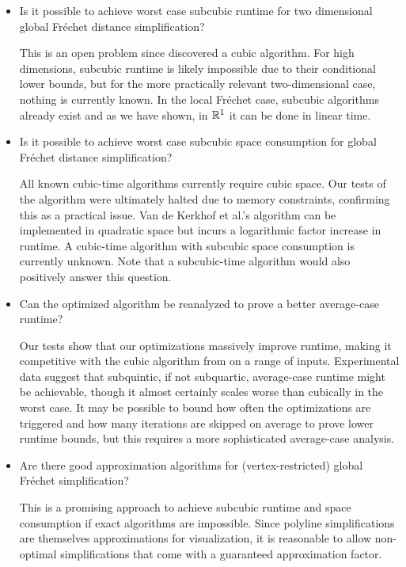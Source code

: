 \begin{itemize}
  \item Is it possible to achieve worst case subcubic runtime for two dimensional global Fréchet distance simplification?

	This is an open problem since \citeauthor{polyline_simplification_has_cubic_complexity_bringmannetal} discovered a cubic algorithm. For high dimensions, subcubic runtime is likely impossible due to their conditional lower bounds, but for the more practically relevant two-dimensional case, nothing is currently known. In the local Fréchet case, subcubic algorithms already exist and as we have shown, in \(\mathbb{R}^1\) it can be done in linear time.
	
	\item Is it possible to achieve worst case subcubic space consumption for global Fréchet distance simplification?

	All known cubic-time algorithms currently require cubic space. Our tests of the \citeauthor{polyline_simplification_has_cubic_complexity_bringmannetal} algorithm were ultimately halted due to memory constraints, confirming this as a practical issue. Van de Kerkhof et al.'s algorithm can be implemented in quadratic space but incurs a logarithmic factor increase in runtime. A cubic-time algorithm with subcubic space consumption is currently unknown. Note that a subcubic-time algorithm would also positively answer this question.

	\item Can the optimized \citeauthor{on_optimal_polyline_simplification_using_the_hausdorff_and_frechet_distance} algorithm be reanalyzed to prove a better average-case runtime?

	Our tests show that our optimizations massively improve runtime, making it competitive with the cubic algorithm from \citeauthor{polyline_simplification_has_cubic_complexity_bringmannetal} on a range of inputs. Experimental data suggest that subquintic, if not subquartic, average-case runtime might be achievable, though it almost certainly scales worse than cubically in the worst case. It may be possible to bound how often the optimizations are triggered and how many iterations are skipped on average to prove lower runtime bounds, but this requires a more sophisticated average-case analysis.

	\item Are there good approximation algorithms for (vertex-restricted) global Fréchet simplification?

	This is a promising approach to achieve subcubic runtime and space consumption if exact algorithms are impossible. Since polyline simplifications are themselves approximations for visualization, it is reasonable to allow non-optimal simplifications that come with a guaranteed approximation factor.
	

\end{itemize}
